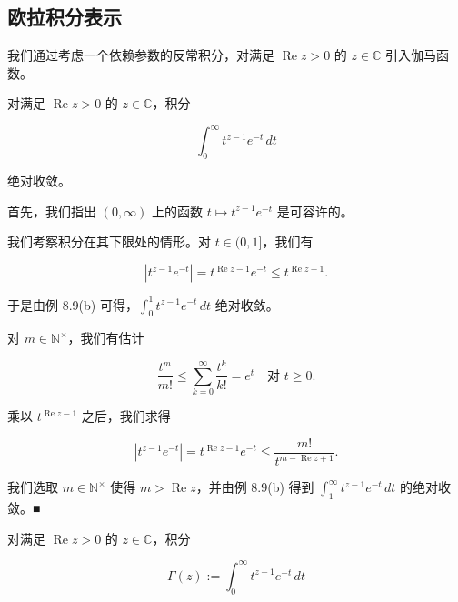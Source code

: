 \subsection*{欧拉积分表示}

我们通过考虑一个依赖参数的反常积分，对满足 $ \operatorname{Re} z > 0 $ 的 $ z \in \mathbb{C} $ 引入伽马函数。

\begin{lemma}

对满足 $ \operatorname{Re} z > 0 $ 的 $ z \in \mathbb{C} $，积分

\[
\int_{0}^{\infty} t^{z-1} e^{-t} \, dt
\]

绝对收敛。

\proofhead
首先，我们指出 $ (0, \infty) $ 上的函数 $ t \mapsto t^{z-1} e^{-t} $ 是可容许的。

\begin{subitems}
\item

我们考察积分在其下限处的情形。对 $ t \in (0, 1] $，我们有

\[
\left| t^{z-1} e^{-t} \right| = t^{\operatorname{Re} z-1} e^{-t} \le t^{\operatorname{Re} z-1} .
\]

于是由例 8.9(b) 可得，$ \int_{0}^{1} t^{z-1} e^{-t} \, dt $ 绝对收敛。

\item

对 $ m \in \mathbb{N}^{\times} $，我们有估计

\[
\frac{t^{m}}{m!} \le \sum_{k=0}^{\infty} \frac{t^{k}}{k!} = e^{t} \quad \text{对 } t \ge 0 .
\]

乘以 $ t^{\operatorname{Re} z-1} $ 之后，我们求得

\[
\left| t^{z-1} e^{-t} \right| = t^{\operatorname{Re} z-1} e^{-t} \le \frac{m!}{t^{m-\operatorname{Re} z+1}} .
\]

我们选取 $ m \in \mathbb{N}^{\times} $ 使得 $ m > \operatorname{Re} z $，并由例 8.9(b) 得到 $ \int_{1}^{\infty} t^{z-1} e^{-t} \, dt $ 的绝对收敛。\nobreak\hspace{0.35em}■

\end{subitems}

\end{lemma}

对满足 $ \operatorname{Re} z > 0 $ 的 $ z \in \mathbb{C} $，积分

\begin{equation}
\Gamma(z) := \int_{0}^{\infty} t^{z-1} e^{-t} \, dt\tag{9.1}
\end{equation}

